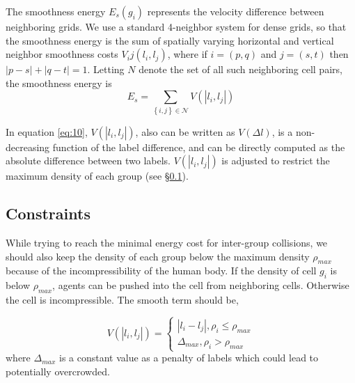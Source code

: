 \documentclass[conference]{acmsiggraph}
\begin{document}
The smoothness energy $E_s(g_i)$ represents the velocity difference between neighboring grids. We use a standard 4-neighbor system for dense grids, so that the smoothness energy is the sum of spatially varying horizontal and vertical neighbor smoothness costs $V_ij(l_i,l_j)$, where if $i=(p,q)$ and $j=(s,t)$ then $|p-s| + |q-t| = 1$. Letting $N$ denote the set of all such neighboring cell pairs, the smoothness energy is
\begin{equation}
\label{eq:10}
E_s = \sum\limits_{\left\{ {i,j} \right\} \in \mathcal{N}} V(\left|l_i,l_j\right|)
\end{equation}

In equation \ref{eq:10}, $V(\left|l_i,l_j\right|)$, also can be written as $V(\Delta l)$, is a non-decreasing function of the label difference, and can be directly computed as the absolute difference between two labels. $V(\left|l_i,l_j\right|)$ is adjusted to restrict the maximum density of each group (see \S\ref{section:4.2}).

\subsection{Constraints}
\label{section:4.2}
While trying to reach the minimal energy cost for inter-group collisions, we should also keep the density of each group below the maximum density $\rho_{max}$ because of the incompressibility of the human body. If the density of cell $g_i$ is below $\rho_{max}$, agents can be pushed into the cell from neighboring cells. Otherwise the cell is incompressible. The smooth term should be,

\begin{equation}
\label{eq:11}
V(\left|l_i,l_j\right|) = \left\{ 
{\begin{array}
{*{20}{c}}
{\left| {{l_i} - {l_j}} \right|,  {\rho _i} \le {\rho _{max}}}\\
{\Delta _{max},  {\rho _i} > {\rho _{max}}}
\end{array}} 
\right.
\end{equation}
where $\Delta_{max}$ is a constant value as a penalty of labels which could lead to potentially overcrowded.
\end{document}
